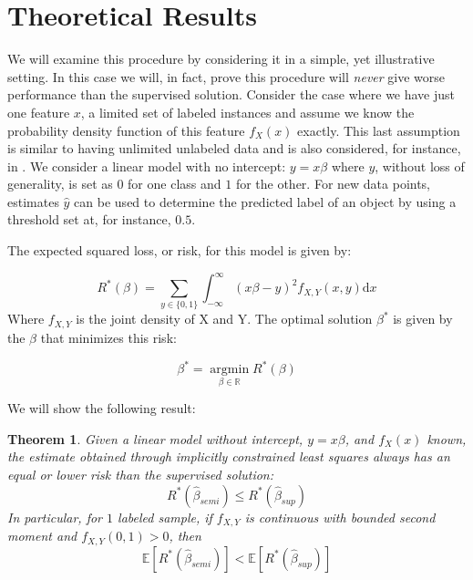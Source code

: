 \documentclass{elsarticle}
\newtheorem{theorem}{Theorem}
\begin{document}
\section{Theoretical Results}
\label{section:theoreticalresults}
We will examine this procedure by considering it in a simple, yet illustrative setting. In this case we will, in fact, prove this procedure will \emph{never} give worse performance than the supervised solution.
Consider the case where we have just one feature $x$, a limited set of labeled instances and assume we know the probability density function of this feature $f_X(x)$ exactly. 
This last assumption is similar to having unlimited unlabeled data and is also considered, for instance, in \cite{Sokolovska2008}. 
We consider a linear model with no intercept: $y = x \beta$ where $y$, without loss of generality, is set as $0$ for one class and $1$ for the other. 
For new data points, estimates $\hat{y}$ can be used to determine the predicted label of an object by using a threshold set at, for instance, $0.5$.

The expected squared loss, or risk, for this model is given by:

\begin{equation} \label{eq:trueloss}
R^*(\beta) = \sum_{y \in \{0,1\}}{ \int_{-\infty}^{\infty}(x \beta - y)^2  f_{X,Y}(x,y)  \mathrm{d}x}
\end{equation}
Where  $f_{X,Y}$ is the joint density of X and Y. The optimal solution $\beta^*$ is given by the $\beta$ that minimizes this risk:

\begin{equation} \label{eq:bayesoptimal}
\beta^* = \operatorname*{argmin}_{\beta \in \mathbb{R}} R^*(\beta)
\end{equation}

We will show the following result:

\begin{theorem}
\label{theorem:1d}
Given a linear model without intercept, $y = x\beta$, and $f_X(x)$ known, the estimate obtained through implicitly constrained least squares always has an equal or lower risk than the supervised solution: $$R^\ast (\hat{\beta}_{semi}) \le R^\ast (\hat{\beta}_{sup})$$
In particular, for $1$ labeled sample, if $f_{X,Y}$ is continuous with bounded second moment and $f_{X,Y}(0,1) > 0$, then $$\mathbb{E}[R^*(\hat{\beta}_{semi})] < \mathbb{E}[R^*(\hat{\beta}_{sup})]$$
\end{theorem}
\end{document}
